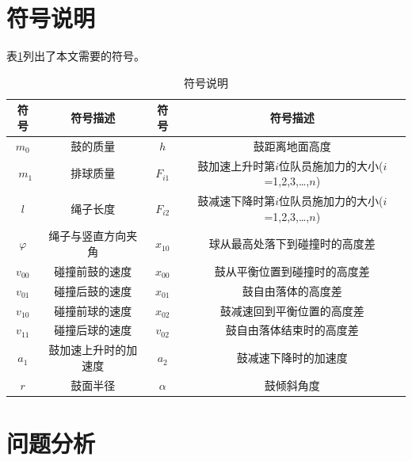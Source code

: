 \documentclass{cumcm}
\begin{document}
\section{符号说明}
表\ref{table-symbol}列出了本文需要的符号。
\begin{table}[H]
  \centering
  \caption{符号说明}\label{table-symbol}
  \begin{tabular*}{\textwidth}{c|c|c|c}
  \hline
  符号 & 符号描述 & 符号 & 符号描述\\
  \hline
  $m_0$ & 鼓的质量 & $h$ & 鼓距离地面高度\\\
  $m_1$ & 排球质量 & $F_{i1}$ & 鼓加速上升时第$i$位队员施加力的大小($i$=1,2,3,\dots,$n$)\\
  $l$ & 绳子长度& $F_{i2}$ & 鼓减速下降时第$i$位队员施加力的大小($i$=1,2,3,\dots,$n$)\\
  $\varphi$ & 绳子与竖直方向夹角 & $x_{10}$ & 球从最高处落下到碰撞时的高度差\\
  $v_{00}$ & 碰撞前鼓的速度 &  $x_{00}$ & 鼓从平衡位置到碰撞时的高度差\\
  $v_{01}$ & 碰撞后鼓的速度 &  $x_{01}$ & 鼓自由落体的高度差\\
  $v_{10}$ & 碰撞前球的速度 & $x_{02}$ & 鼓减速回到平衡位置的高度差\\
  $v_{11}$ & 碰撞后球的速度 & $v_{02}$ & 鼓自由落体结束时的高度差\\
  $a_1$ & 鼓加速上升时的加速度 & $a_2$ & 鼓减速下降时的加速度\\
  $r$ & 鼓面半径 & $\alpha$ & 鼓倾斜角度\\
  \hline
  \end{tabular*}
\end{table}


\section{问题分析}
\end{document}
